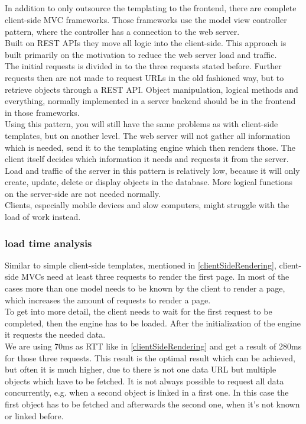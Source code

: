\subsection{\ClientSideMVC{}\label{clientSideMVC}}
In addition to only outsource the templating to the frontend, there are complete client-side MVC frameworks.
Those frameworks use the model view controller pattern, where the controller has a connection to the web server.
\\
Built on REST APIs they move all logic into the client-side.
This approach is built primarily on the motivation to reduce the web server load and traffic.
\\
The initial requests is divided in to the three requests stated before.
Further requests then are not made to request URLs in the old fashioned way, but to retrieve objects through a REST API. 
Object manipulation, logical methods and everything, normally implemented in a server backend should be in the frontend in those frameworks.
\\
Using this pattern, you will still have the same problems as with client-side templates, but on another level.
The web server will not gather all information which is needed, send it to the templating engine which then renders those.
The client itself decides which information it needs and requests it from the server.
\\
Load and traffic of the server in this pattern is relatively low, because it will only create, update, delete or display objects in the database. 
More logical functions on the server-side are not needed normally.
\\
Clients, especially mobile devices and slow computers, might struggle with the load of work instead.

\subsubsection{load time analysis}
Similar to simple client-side templates, mentioned in \ref{clientSideRendering}, client-side MVCs need at least three requests to render the first page.
In most of the cases more than one model needs to be known by the client to render a page, which increases the amount of requests to render a page.
\\
To get into more detail, the client needs to wait for the first request to be completed, then the \ajax{} engine has to be loaded.
After the initialization of the \ajax{} engine it requests the needed data.
\\
We are using 70ms as RTT like in \ref{clientSideRendering} and get a result of 280ms for those three requests.
This result is the optimal result which can be achieved, but often it is much higher, due to there is not one data URL but multiple objects which have to be fetched.
It is not always possible to request all data concurrently, e.g. when a second object is linked in a first one.
In this case the first object has to be fetched and afterwards the second one, when it's not known or linked before.

